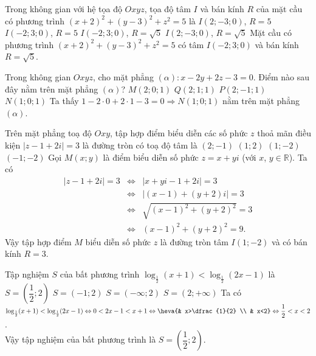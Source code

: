 \begin{ex}%
	Trong không gian với hệ tọa độ $Oxyz$, tọa độ tâm $I$ và bán kính $R$ của mặt cầu có phương trình $(x+2)^2+(y-3)^2+z^2=5$ là
	\choice
	{$I(2;-3;0)$, $R=5$}
	{$I(-2;3;0)$, $R=5$}
	{\True $I(-2;3;0)$, $R=\sqrt{5}$}
	{$I(2;-3;0)$, $R=\sqrt{5}$}
	\loigiai
	{
		Mặt cầu có phương trình $(x+2)^2+(y-3)^2+z^2=5$ có tâm $I(-2;3;0)$ và bán kính $R=\sqrt{5}$.
	}
\end{ex}

\begin{ex}%
	Trong không gian $Oxyz$, cho mặt phẳng $(\alpha)\colon x-2y+2z-3=0$. Điểm nào sau đây nằm trên mặt phẳng $(\alpha)$?
	\choice
	{$M(2;0;1)$}
	{$Q(2;1;1)$}
	{$P(2;-1;1)$}
	{\True $N(1;0;1)$}
	\loigiai
	{
		Ta thấy $1-2\cdot 0+2\cdot 1-3=0\Rightarrow N(1;0;1)$ nằm trên mặt phẳng $(\alpha)$.
	}
\end{ex}

\begin{ex}%
	Trên mặt phẳng toạ độ $Oxy$, tập hợp điểm biểu diễn các số phức $z$ thoả mãn điều kiện $|z-1+2i|=3$ là đường tròn có toạ độ tâm là
	\choice
	{$(2;-1)$}
	{$(1;2)$}
	{\True $(1;-2)$}
	{$(-1;-2)$}
	\loigiai
	{
		Gọi $M(x;y)$ là điểm biểu diễn số phức $z=x+yi$ (với $x$, $y\in \mathbb{R}$). Ta có
		\begin{eqnarray*}
			|z-1+2i|=3&\Leftrightarrow &|x+yi-1+2i|=3\\
			&\Leftrightarrow &|(x-1)+(y+2)i|=3\\
			&\Leftrightarrow &\sqrt{(x-1)^2+(y+2)^2}=3\\
			&\Leftrightarrow &(x-1)^2+(y+2)^2=9.
		\end{eqnarray*}
		Vậy tập hợp điểm $M$ biểu diễn số phức $z$ là đường tròn tâm $I(1;-2)$ và có bán kính $R=3$.
	}
\end{ex}

\begin{ex}%
	Tập nghiệm $S$ của bất phương trình $\log_{\frac{1}{2}}(x+1)<\log_{\frac{1}{2}}(2x-1)$ là
	\choice
	{\True $S=\left(\dfrac{1}{2};2\right)$}
	{$S=(-1;2)$}
	{$S=(-\infty;2)$}
	{$S=(2;+\infty)$}
	\loigiai
	{
		Ta có $\log_{\frac{1}{2}}(x+1)<\log_{\frac{1}{2}}(2x-1)\Leftrightarrow 0<2x-1<x+1\Leftrightarrow \heva{& x>\dfrac{1}{2} \\ & x<2}\Leftrightarrow \dfrac{1}{2}<x<2$.\\
		Vậy tập nghiệm của bất phương trình là $S=\left(\dfrac{1}{2};2\right)$.
	}
\end{ex}

